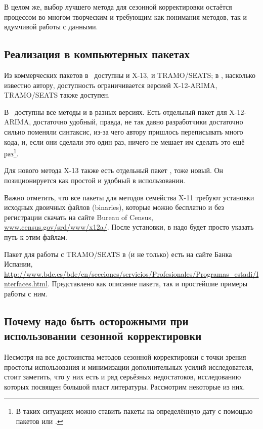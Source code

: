 \documentclass[final,pdftex]{../../template/epsilonj}\usepackage[]{graphicx}\usepackage[]{color}
\begin{document}
В целом же, выбор лучшего метода для сезонной корректировки остаётся процессом во многом творческим и требующим как понимания методов, так и вдумчивой работы с данными. 

\subsection{Реализация в компьютерных пакетах}

Из коммерческих пакетов в~ доступны и X-13, и TRAMO/SEATS; в , насколько известно автору, доступность ограничивается версией X-12-ARIMA, TRAMO/SEATS также доступен. 

В~ доступны все методы и в разных версиях. Есть отдельный пакет  для X-12-ARIMA,
достаточно удобный, правда, не так давно разработчики достаточно сильно поменяли синтаксис, из-за чего автору пришлось переписывать много кода, и, если они сделали это один раз, ничего не мешает им сделать это ещё раз\footnote{В таких ситуациях можно ставить пакеты  на определённую дату с помощью пакетов  или .}. 

Для нового метода X-13 также есть отдельный пакет ,
тоже новый. Он позиционируется как простой и удобный в использовании. 

Важно отметить, что все пакеты для методов семейства X-11 требуют установки исходных двоичных файлов (binaries), которые можно бесплатно и без регистрации скачать на сайте Bureau of Census, \href{http://www.census.gov/srd/www/x12a/}{www.census.gov/srd/www/x12a/}. После установки, в  надо будет просто указать путь к этим файлам. 

Пакет для работы с TRAMO/SEATS в   (и не только) есть на сайте Банка Испании, \url{http://www.bde.es/bde/en/secciones/servicios/Profesionales/Programas_estadi/Interfaces.html}. Представлено как описание пакета, так и простейшие примеры работы с ним. 

\subsection{Почему надо быть осторожными при использовании сезонной корректировки}

Несмотря на все достоинства методов сезонной корректировки с точки зрения простоты использования и минимизации дополнительных усилий исследователя, стоит заметить, что у них есть и ряд серьёзных недостатоков, исследованию которых посвящен большой пласт литературы. Рассмотрим некоторые из них. 
\end{document}
